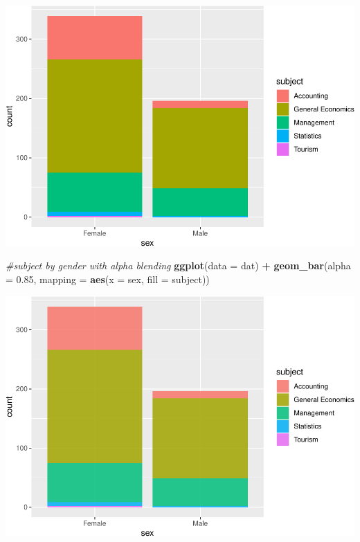 \documentclass[]{article}
\newenvironment{Shaded}{\begin{snugshade}}{\end{snugshade}}
\newcommand{\CommentTok}[1]{\textcolor[rgb]{0.56,0.35,0.01}{\textit{#1}}}
\newcommand{\DataTypeTok}[1]{\textcolor[rgb]{0.13,0.29,0.53}{#1}}
\newcommand{\FloatTok}[1]{\textcolor[rgb]{0.00,0.00,0.81}{#1}}
\newcommand{\KeywordTok}[1]{\textcolor[rgb]{0.13,0.29,0.53}{\textbf{#1}}}
\newcommand{\NormalTok}[1]{#1}
\newcommand{\OperatorTok}[1]{\textcolor[rgb]{0.81,0.36,0.00}{\textbf{#1}}}
\newcommand{\StringTok}[1]{\textcolor[rgb]{0.31,0.60,0.02}{#1}}
\begin{document}
\includegraphics{StudentGoals_files/figure-latex/unnamed-chunk-11-4.pdf}

\begin{Shaded}
\begin{Highlighting}[]
\CommentTok{#subject by gender with alpha blending}
\KeywordTok{ggplot}\NormalTok{(}\DataTypeTok{data =}\NormalTok{ dat) }\OperatorTok{+}\StringTok{ }
\StringTok{  }\KeywordTok{geom_bar}\NormalTok{(}\DataTypeTok{alpha =} \FloatTok{0.85}\NormalTok{, }\DataTypeTok{mapping =} \KeywordTok{aes}\NormalTok{(}\DataTypeTok{x =}\NormalTok{ sex, }\DataTypeTok{fill =}\NormalTok{ subject))}
\end{Highlighting}
\end{Shaded}

\includegraphics{StudentGoals_files/figure-latex/unnamed-chunk-11-5.pdf}
\end{document}

